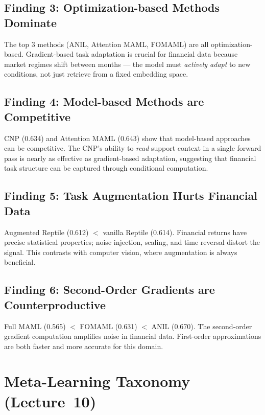 \documentclass[11pt,a4paper]{article}
\begin{document}
\subsection{Finding 3: Optimization-based Methods Dominate}
The top 3 methods (ANIL, Attention MAML, FOMAML) are all optimization-based. Gradient-based task adaptation is crucial for financial data because market regimes shift between months --- the model must \emph{actively adapt} to new conditions, not just retrieve from a fixed embedding space.

\subsection{Finding 4: Model-based Methods are Competitive}
CNP (0.634) and Attention MAML (0.643) show that model-based approaches can be competitive. The CNP's ability to \emph{read} support context in a single forward pass is nearly as effective as gradient-based adaptation, suggesting that financial task structure can be captured through conditional computation.

\subsection{Finding 5: Task Augmentation Hurts Financial Data}
Augmented Reptile (0.612) $<$ vanilla Reptile (0.614). Financial returns have precise statistical properties; noise injection, scaling, and time reversal distort the signal. This contrasts with computer vision, where augmentation is always beneficial.

\subsection{Finding 6: Second-Order Gradients are Counterproductive}
Full MAML (0.565) $<$ FOMAML (0.631) $<$ ANIL (0.670). The second-order gradient computation amplifies noise in financial data. First-order approximations are both faster and more accurate for this domain.

\section{Meta-Learning Taxonomy (Lecture~10)}
\end{document}
